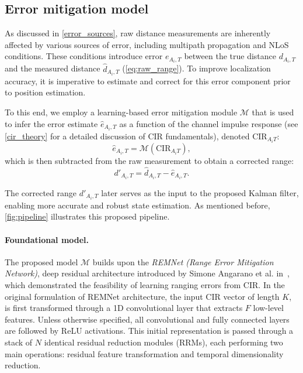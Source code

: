 \subsection{Error mitigation model}

As discussed in \autoref{error_sources}, raw distance measurements are inherently affected by various sources of error, including multipath propagation and NLoS conditions. These conditions introduce error $e_{A_i,T}$ between the true distance $d_{A_i,T}$ and the measured distance $\hat{d}_{A_i,T}$ (\autoref{eq:raw_range}). To improve localization accuracy, it is imperative to estimate and correct for this error component prior to position estimation. 

To this end, we employ a learning-based error mitigation module $\mathcal{M}$ that is used to infer the error estimate $\hat{e}_{A_i,T}$ as a function of the channel impulse response (see \autoref{cir_theory} for a detailed discussion of CIR fundamentals), denoted $\text{CIR}_{A_iT}$:
\begin{equation}
    \hat{e}_{A_i,T} = \mathcal{M}(\text{CIR}_{A_iT}),
\end{equation}
which is then subtracted from the raw measurement to obtain a corrected range:
\begin{equation}
    d'_{A_i,T} = \hat{d}_{A_i,T} - \hat{e}_{A_i,T}.
\end{equation}

The corrected range $d'_{A_i,T}$ later serves as the input to the proposed Kalman filter, enabling more accurate and robust state estimation. As mentioned before, \autoref{fig:pipeline} illustrates this proposed pipeline.

\paragraph{Foundational model.}

The proposed model $\mathcal{M}$ builds upon the \emph{REMNet (Range Error Mitigation Network)}, deep residual architecture introduced by Simone Angarano et al. in~\cite{Simone2021UWB}, which demonstrated the feasibility of learning ranging errors from CIR. In the original formulation of REMNet architecture, the input CIR vector of length $K$, is first transformed through a 1D convolutional layer that extracts $F$ low-level features. Unless otherwise specified, all convolutional and fully connected layers are followed by ReLU activations. This initial representation is passed through a stack of $N$ identical residual reduction modules (RRMs), each performing two main operations: residual feature transformation and temporal dimensionality reduction. 

